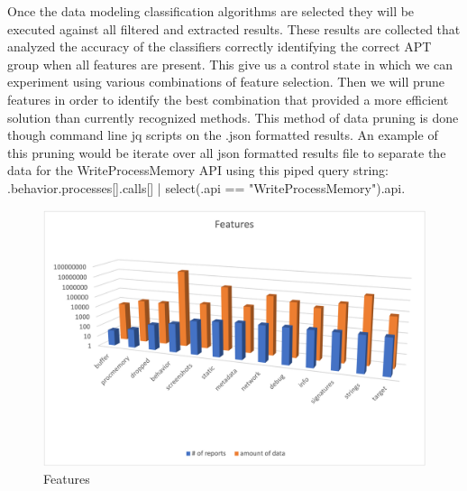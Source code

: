 \documentclass[12pt]{report}
\begin{document}
Once the data modeling classification algorithms are selected they will be executed against all filtered and extracted results.  These results are collected that analyzed the accuracy of the classifiers correctly identifying the correct APT group when all features are present.  This give us a control state in which we can experiment using various combinations of feature selection. Then we will prune features in order to identify the best combination that provided a more efficient solution than currently recognized methods.  This method of data pruning is done though command line jq scripts on the .json formatted results.  An example of this pruning would be iterate over all json formatted results file to separate the data for the WriteProcessMemory API using this piped query string: .behavior.processes[].calls[] | select(.api == "WriteProcessMemory").api.    

\begin{figure}
	\centering
	\includegraphics[width=.90\textwidth]{images/13_features_reports-vs-data.png}
	\caption{Features}
	\label{fig:Features}
\end{figure}
\end{document}
